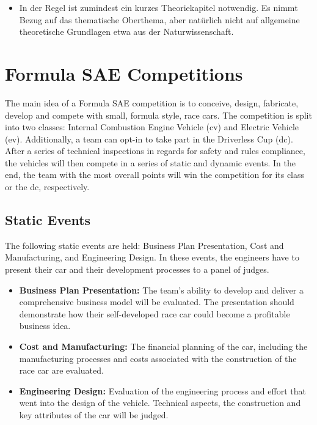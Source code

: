 \begin{itemize}
    \item In der Regel ist zumindest ein kurzes Theoriekapitel notwendig. Es nimmt Bezug auf das thematische Oberthema, aber natürlich nicht auf allgemeine theoretische Grundlagen etwa aus der Naturwissenschaft.
\end{itemize}

\section{Formula SAE Competitions}
The main idea of a Formula SAE competition is to conceive, design, fabricate, develop and compete with small, formula style, race cars.
The competition is split into two classes: Internal Combustion Engine Vehicle (\acrshort{cv}) and Electric Vehicle (\acrshort{ev}).
Additionally, a team can opt-in to take part in the Driverless Cup (\acrshort{dc}).
After a series of technical inspections in regards for safety and rules compliance, the vehicles will then compete in a series of static and dynamic events. In the end, the team with the most overall points will win the competition for its class or the \acrlong{dc}, respectively. \cite{fs_rules_2022_handbook}

\subsection{Static Events}
The following static events are held: Business Plan Presentation, Cost and Manufacturing, and Engineering Design. In these events, the engineers have to present their car and their development processes to a panel of judges. \cite{fs_rules_2022_handbook}

\begin{itemize}
    \item \textbf{Business Plan Presentation:} The team's ability to develop and deliver a comprehensive business model will be evaluated. The presentation should demonstrate how their self-developed race car could become a profitable business idea.
    \item \textbf{Cost and Manufacturing:} The financial planning of the car, including the manufacturing processes and costs associated with the construction of the race car are evaluated.
    \item \textbf{Engineering Design:} Evaluation of the engineering process and effort that went into the design of the vehicle. Technical aspects, the construction and key attributes of the car will be judged.
\end{itemize}

